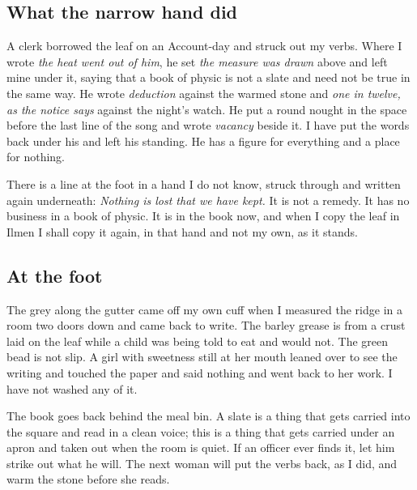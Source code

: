 \documentclass{design/chronicle}
\begin{document}
\subsection*{What the narrow hand did}

A clerk borrowed the leaf on an Account-day and struck out my verbs. Where I wrote \emph{the heat went out of him}, he set \emph{the measure was drawn} above and left mine under it, saying that a book of physic is not a slate and need not be true in the same way. He wrote \emph{deduction} against the warmed stone and \emph{one in twelve, as the notice says} against the night’s watch. He put a round nought in the space before the last line of the song and wrote \emph{vacancy} beside it. I have put the words back under his and left his standing. He has a figure for everything and a place for nothing.

There is a line at the foot in a hand I do not know, struck through and written again underneath: \emph{Nothing is lost that we have kept.} It is not a remedy. It has no business in a book of physic. It is in the book now, and when I copy the leaf in Ilmen I shall copy it again, in that hand and not my own, as it stands.

\subsection*{At the foot}

The grey along the gutter came off my own cuff when I measured the ridge in a room two doors down and came back to write. The barley grease is from a crust laid on the leaf while a child was being told to eat and would not. The green bead is not slip. A girl with sweetness still at her mouth leaned over to see the writing and touched the paper and said nothing and went back to her work. I have not washed any of it.

The book goes back behind the meal bin. A slate is a thing that gets carried into the square and read in a clean voice; this is a thing that gets carried under an apron and taken out when the room is quiet. If an officer ever finds it, let him strike out what he will. The next woman will put the verbs back, as I did, and warm the stone before she reads.
\end{document}
